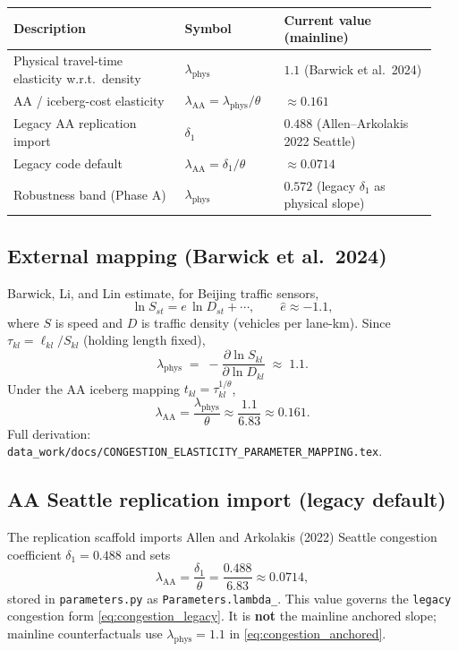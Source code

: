 \documentclass[11pt]{article}
\newcommand{\phys}{\mathrm{phys}}
\newcommand{\AAcal}{\mathrm{AA}}
\begin{document}
\begin{longtable}{@{}p{0.38\linewidth}p{0.22\linewidth}p{0.34\linewidth}@{}}
\toprule
\textbf{Description} & \textbf{Symbol} & \textbf{Current value (mainline)} \\
\midrule
\endhead
Physical travel-time elasticity w.r.t.\ density &
  $\lambda_{\phys}$ & $\mathbf{1.1}$ (Barwick et al.\ 2024) \\
AA / iceberg-cost elasticity &
  $\lambda_{\AAcal}=\lambda_{\phys}/\theta$ & $\approx 0.161$ \\
Legacy AA replication import &
  $\delta_1$ & $0.488$ (Allen--Arkolakis 2022 Seattle) \\
Legacy code default &
  $\lambda_{\AAcal}=\delta_1/\theta$ & $\approx 0.0714$ \\
Robustness band (Phase A) &
  $\lambda_{\phys}$ & $0.572$ (legacy $\delta_1$ as physical slope) \\
\bottomrule
\end{longtable}

\subsection{External mapping (Barwick et al.\ 2024)}

Barwick, Li, and Lin estimate, for Beijing traffic sensors,
\begin{equation}
  \ln S_{st} = e\,\ln D_{st} + \cdots,
  \qquad \hat e \approx -1.1,
\end{equation}
where $S$ is speed and $D$ is traffic density (vehicles per lane-km).
Since $\tau_{kl}=\ell_{kl}/S_{kl}$ (holding length fixed),
\begin{equation}\label{eq:lambda_phys_barwick}
  \lambda_{\phys}
  \;=\;
  -\frac{\partial\ln S_{kl}}{\partial\ln D_{kl}}
  \;\approx\;
  1.1.
\end{equation}
Under the AA iceberg mapping $t_{kl}=\tau_{kl}^{1/\theta}$,
\begin{equation}\label{eq:lambda_AA_barwick}
  \lambda_{\AAcal} = \frac{\lambda_{\phys}}{\theta} \approx \frac{1.1}{6.83} \approx 0.161.
\end{equation}
Full derivation:
\texttt{data\_work/docs/CONGESTION\_ELASTICITY\_PARAMETER\_MAPPING.tex}.

\subsection{AA Seattle replication import (legacy default)}

The replication scaffold imports Allen and Arkolakis (2022) Seattle
congestion coefficient $\delta_1=0.488$ and sets
\begin{equation}
  \lambda_{\AAcal} = \frac{\delta_1}{\theta} = \frac{0.488}{6.83} \approx 0.0714,
\end{equation}
stored in \texttt{parameters.py} as \texttt{Parameters.lambda\_}.
This value governs the \texttt{legacy} congestion form
\eqref{eq:congestion_legacy}.  It is \textbf{not} the mainline anchored
slope; mainline counterfactuals use $\lambda_{\phys}=1.1$ in
\eqref{eq:congestion_anchored}.
\end{document}

